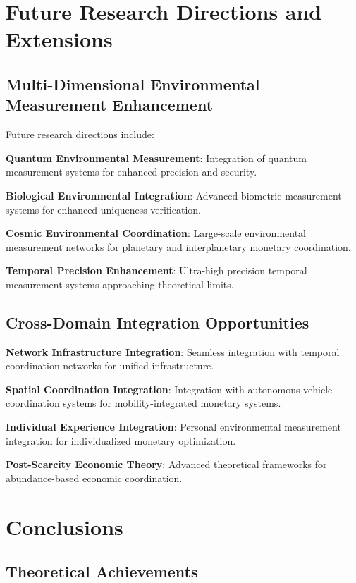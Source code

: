 \documentclass[12pt,a4paper]{article}
\begin{document}
\section{Future Research Directions and Extensions}

\subsection{Multi-Dimensional Environmental Measurement Enhancement}

Future research directions include:

\textbf{Quantum Environmental Measurement}: Integration of quantum measurement systems for enhanced precision and security.

\textbf{Biological Environmental Integration}: Advanced biometric measurement systems for enhanced uniqueness verification.

\textbf{Cosmic Environmental Coordination}: Large-scale environmental measurement networks for planetary and interplanetary monetary coordination.

\textbf{Temporal Precision Enhancement}: Ultra-high precision temporal measurement systems approaching theoretical limits.

\subsection{Cross-Domain Integration Opportunities}

\textbf{Network Infrastructure Integration}: Seamless integration with temporal coordination networks for unified infrastructure.

\textbf{Spatial Coordination Integration}: Integration with autonomous vehicle coordination systems for mobility-integrated monetary systems.

\textbf{Individual Experience Integration}: Personal environmental measurement integration for individualized monetary optimization.

\textbf{Post-Scarcity Economic Theory}: Advanced theoretical frameworks for abundance-based economic coordination.

\section{Conclusions}

\subsection{Theoretical Achievements}
\end{document}

